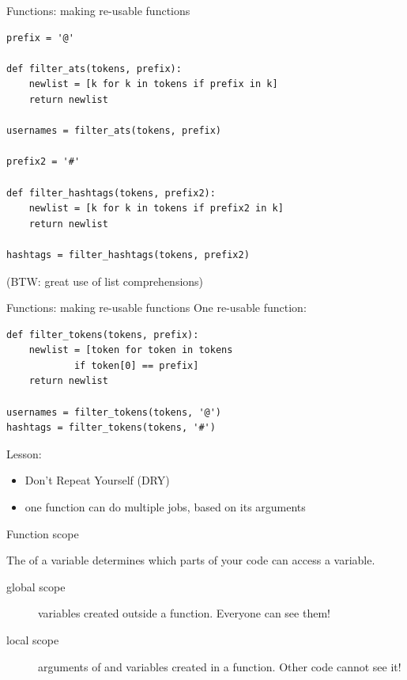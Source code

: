 \documentclass{beamer}
\begin{document}
\begin{frame}[fragile]{Functions: making re-usable functions}
\begin{lstlisting}[style=smaller]
prefix = '@'

def filter_ats(tokens, prefix):
    newlist = [k for k in tokens if prefix in k]
    return newlist

usernames = filter_ats(tokens, prefix)

prefix2 = '#'

def filter_hashtags(tokens, prefix2):
    newlist = [k for k in tokens if prefix2 in k]
    return newlist

hashtags = filter_hashtags(tokens, prefix2)
\end{lstlisting}

(BTW: great use of list comprehensions)
\end{frame}

\begin{frame}[fragile]{Functions: making re-usable functions}
One re-usable function: 
\begin{lstlisting}[style=smaller]
def filter_tokens(tokens, prefix):
    newlist = [token for token in tokens
            if token[0] == prefix]
    return newlist

usernames = filter_tokens(tokens, '@')
hashtags = filter_tokens(tokens, '#')
\end{lstlisting}

Lesson:
    \begin{itemize}
        \item Don't Repeat Yourself (DRY)
        \item one function can do multiple jobs,
            based on its arguments
    \end{itemize}
\end{frame}

\begin{frame}[fragile]{Function scope}
    \begin{definition}
        The  of a variable determines
            which parts of your code can access a variable.
    \end{definition}
    \begin{description}
        \item[global scope]
            variables created outside a function.
            Everyone can see them!
        \item[local scope]
            arguments of and variables created in a function.
            Other code cannot see it!
    \end{description}
\end{frame}
\end{document}
